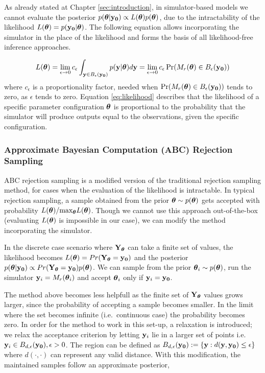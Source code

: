 As already stated at Chapter \ref{sec:introduction}, in
simulator-based models we cannot evaluate the posterior
$p(\boldsymbol{\theta}|\mathbf{y_0}) \propto L(\boldsymbol{\theta})p(\boldsymbol{\theta})$, due to the
intractability of the likelihood $L(\boldsymbol{\theta}) = p(\mathbf{y_0}|\boldsymbol{\theta})$. The
following equation allows incorporating the simulator in the place of
the likelihood and forms the basis of all likelihood-free inference
approaches.

\begin{equation} \label{eq:likelihood}
  L(\boldsymbol{\theta}) =
  \lim_{\epsilon \to 0} c_\epsilon \int_{\mathbf{y} \in B_\epsilon(\mathbf{y_0})} p(\mathbf{y}|\boldsymbol{\theta})d\mathbf{y} =
  \lim_{\epsilon \to 0} c_\epsilon \Pr(M_r(\boldsymbol{\theta}) \in B_\epsilon(\mathbf{y_0}))
\end{equation}
%
where $c_\epsilon$ is a proportionality factor, needed when
$\Pr(M_r(\boldsymbol{\theta}) \in B_\epsilon(\mathbf{y_0}))$ tends to zero, as $\epsilon$
tends to zero. Equation \ref{eq:likelihood} describes that the
likelihood of a specific parameter configuration $\boldsymbol{\theta}$ is
proportional to the probability that the simulator will produce
outputs equal to the observations, given the specific configuration.

\subsubsection{Approximate Bayesian Computation (ABC) Rejection
  Sampling}

ABC rejection sampling is a modified version of the traditional
rejection sampling method, for cases when the evaluation of the
likelihood is intractable. In typical rejection sampling, a sample
obtained from the prior $\boldsymbol{\theta} \sim p(\boldsymbol{\theta})$ gets accepted
with probability $L(\boldsymbol{\theta})/ \text{max}_{\boldsymbol{\theta}}
L(\boldsymbol{\theta})$. Though we cannot use this approach out-of-the-box
(evaluating $L(\boldsymbol{\theta})$ is impossible in our case), we can
modify the method incorporating the simulator.

In the discrete case scenario where $\mathbf{Y}_{\boldsymbol{\theta}}$ can take a finite
set of values, the likelihood becomes
$L(\boldsymbol{\theta}) = Pr(\mathbf{Y}_{\boldsymbol{\theta}} = \mathbf{y_0})$ and the posterior
$p(\boldsymbol{\theta}|\mathbf{y_0}) \propto Pr(\mathbf{Y}_{\boldsymbol{\theta}}=\mathbf{y_0})p(\boldsymbol{\theta})$. We can
sample from the prior $\boldsymbol{\theta}_i \sim p(\boldsymbol{\theta})$, run the simulator
$\mathbf{y}_i = M_r(\boldsymbol{\theta}_i)$ and accept $\boldsymbol{\theta}_i$ only if
$\mathbf{y}_i = \mathbf{y_0}$.

The method above becomes less helpfull as the finite set of
$\mathbf{Y}_{\boldsymbol{\theta}}$ values grows larger, since the probability of
accepting a sample becomes smaller. In the limit
where the set becomes infinite (i.e.\ continuous case) the probability
becomes zero. In order for the method to work in this set-up, a
relaxation is introduced; we relax the acceptance criterion by letting
$\mathbf{y}_{i}$ lie in a larger set of points i.e.\
$\mathbf{y}_{i} \in B_{d,\epsilon}(\mathbf{y_0}), \epsilon > 0$. The region can be
defined as $B_{d,\epsilon} (\mathbf{y_0}) := \{\mathbf{y}: d(\mathbf{y}, \mathbf{y_0}) \leq \epsilon \}$
where $d(\cdot, \cdot)$ can represent any valid distance. With this
modification, the maintained samples follow an approximate posterior,

